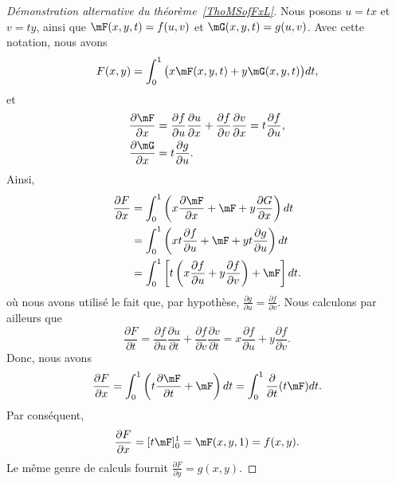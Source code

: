 \begin{proof}[Démonstration alternative du théorème~\ref{ThoMSofFxL}]
	Nous posons \( u=tx\) et \( v=ty\), ainsi que \( \mF(x,y,t)=f(u,v)\) et \( \mG(x,y,t)=g(u,v)\). Avec cette notation, nous avons
	\begin{equation}
		F(x,y)=\int_0^1\big( x\mF(x,y,t)+y\mG(x,y,t) \big)dt,
	\end{equation}
	et
	\begin{equation}
		\begin{aligned}[]
			\frac{ \partial \mF }{ \partial x } & =\frac{ \partial f }{ \partial u }\frac{ \partial u }{ \partial x }+\frac{ \partial f }{ \partial v }\frac{ \partial v }{ \partial x }=t\frac{ \partial f }{ \partial u }, \\
			\frac{ \partial \mG }{ \partial x } & =t\frac{ \partial g }{ \partial u }.
		\end{aligned}
	\end{equation}
	Ainsi,
	\begin{equation}
		\begin{aligned}[]
			\frac{ \partial F }{ \partial x } & =\int_0^1\left( x\frac{ \partial \mF }{ \partial x }+\mF+y\frac{ \partial G }{ \partial x } \right)dt                  \\
			                                  & =\int_0^1\left( xt\frac{ \partial f }{ \partial u } +\mF+yt\frac{ \partial g }{ \partial u } \right)dt                 \\
			                                  & =\int_0^1\left[  t\left( x\frac{ \partial f }{ \partial u }+y\frac{ \partial f }{ \partial v } \right)+\mF  \right]dt.
		\end{aligned}
	\end{equation}
	où nous avons utilisé le fait que, par hypothèse, \( \frac{ \partial g }{ \partial u }=\frac{ \partial f }{ \partial v }\). Nous calculons par ailleurs que
	\begin{equation}
		\frac{ \partial F }{ \partial t }=\frac{ \partial f }{ \partial u }\frac{ \partial u }{ \partial t }+\frac{ \partial f }{ \partial v }\frac{ \partial v }{ \partial t }=x\frac{ \partial f }{ \partial u }+y\frac{ \partial f }{ \partial v }.
	\end{equation}
	Donc, nous avons
	\begin{equation}
		\frac{ \partial F }{ \partial x }=\int_0^1\left( t\frac{ \partial \mF }{ \partial t }+\mF \right)dt=\int_0^1\frac{ \partial  }{ \partial t }(t\mF)dt.
	\end{equation}
	Par conséquent,
	\begin{equation}
		\frac{ \partial F }{ \partial x }=[t\mF]_0^1=\mF(x,y,1)=f(x,y).
	\end{equation}
	Le même genre de calculs fournit \( \frac{ \partial F }{ \partial y }=g(x,y)\).
\end{proof}

